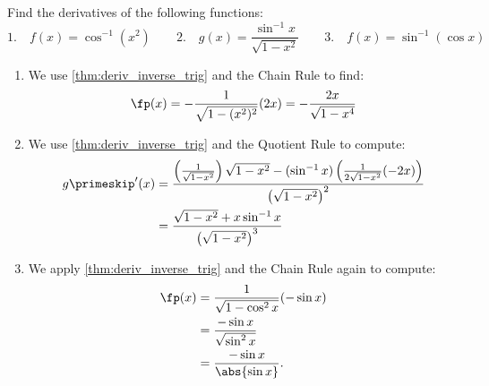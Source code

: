 %

\begin{example}\label{eg_inv_derivs}%
Find the derivatives of the following functions:
\[
 \text{1.}\quad f(x)=\cos^{-1}(x^2)\qquad
 \text{2.}\quad g(x)=\frac{\sin^{-1}x}{\sqrt{1-x^2}}\qquad
 \text{3.}\quad f(x)=\sin^{-1}(\cos x)
\]
\solution
\begin{enumerate}
\item We use \autoref{thm:deriv_inverse_trig} and the Chain Rule to find:
\[\fp(x)=-\frac{1}{\sqrt{1-(x^2)^2}}(2x)=- \frac{2x}{\sqrt{1-x^4}}\]
\item We use \autoref{thm:deriv_inverse_trig} and the Quotient Rule to compute: 
\begin{align*}
 g\primeskip'(x)
 &=\frac{\left(\frac 1{\sqrt{1-x^2}}\right)\sqrt{1-x^2} - (\sin^{-1} x)\left( \frac 1{2\sqrt{1-x^2}} (-2x)\right)}{\left(\sqrt{1-x^2}\right)^2}\\
 &=\frac{\sqrt{1-x^2}+x\sin^{-1}x}{\left(\sqrt{1-x^2}\right)^3}
\end{align*}
\item We apply \autoref{thm:deriv_inverse_trig} and the Chain Rule again to compute:
\begin{align*}
 \fp(x)&=\frac{1}{\sqrt{1-\cos^2x}}(-\sin x)\\
 &=\frac{-\sin x}{\sqrt{\sin^2x}}\\
 &=\frac{-\sin x}{\abs{\sin x}}.
\end{align*}
\end{enumerate}
\end{example}


